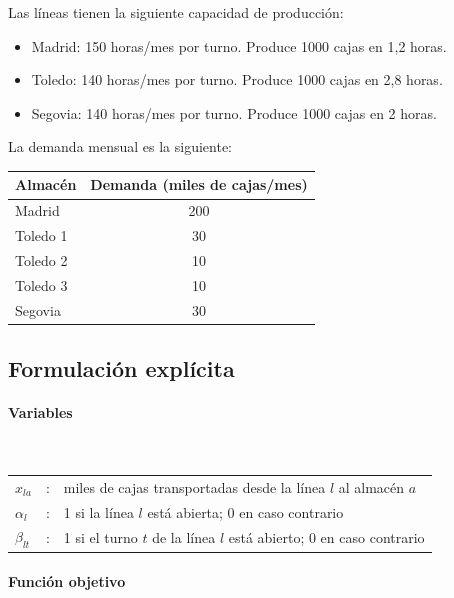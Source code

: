 Las líneas tienen la siguiente capacidad de producción:

\begin{itemize}
    \item Madrid: 150 horas/mes por turno. Produce 1000 cajas en 1,2 horas.
    \item Toledo: 140 horas/mes por turno. Produce 1000 cajas en 2,8 horas.
    \item Segovia: 140 horas/mes por turno. Produce 1000 cajas en 2 horas.
\end{itemize}

La demanda mensual es la siguiente:

\begin{center}
\begin{tabular}{lc}
\toprule
Almacén & Demanda (miles de cajas/mes) \\
\midrule
Madrid & 200 \\
Toledo 1 & 30 \\
Toledo 2 & 10 \\
Toledo 3 & 10 \\
Segovia & 30 \\
\bottomrule
\end{tabular}
\end{center}




\subsection{Formulación explícita}

\paragraph{Variables}\mbox{}\\

\begin{tabular}{lcl}
$x_{la}$ & : & miles de cajas transportadas desde la línea $l$ al almacén $a$ \\
$\alpha_l$ & : & 1 si la línea $l$ está abierta; 0 en caso contrario \\
$\beta_{lt}$ & : & 1 si el turno $t$ de la línea $l$ está abierto; 0 en caso contrario \\
\end{tabular}

\paragraph{Función objetivo}\mbox{}\\

